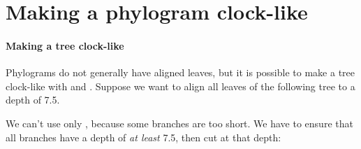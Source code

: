 \section{Making a phylogram clock-like}
\label{sct_clocklike}


\paragraph{Making a tree clock-like}

Phylograms do not generally have aligned leaves, but it is possible to make a
tree clock-like with \luaed{} and \trim{}. Suppose we want to align all leaves
of the following tree to a depth of 7.5.

\begin{samepage}


\end{samepage}

We can't use only \trim, because some branches are too short. We have to ensure
that all branches have a depth of \emph{at least} 7.5, then cut at that depth:





